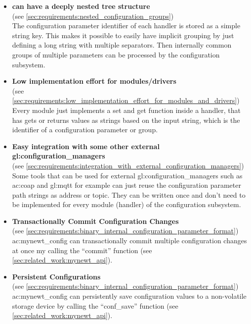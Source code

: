 \begin{itemize}
      \item \textbf{ can have a deeply nested tree structure}\\
            (see \autoref{sec:requirements:nested_configuration_groups})\\
            The configuration parameter identifier of each handler is stored as a simple string key.
            This makes it possible to easily have implicit grouping by just defining a long string with multiple separators.
            Then internally common groups of multiple parameters can be processed by the configuration subsystem.

      \item \textbf{Low implementation effort for modules/drivers}\\
            (see \autoref{sec:requirements:low_implementation_effort_for_modules_and_drivers})\\
            Every module just implements a set and get function inside a handler, that has gets or returns values as strings based on the input string, which is the identifier of a configuration parameter or group.

      \item \textbf{Easy integration with some other external \glspl{gl:configuration_manager}}\\
            (see \autoref{sec:requirements:integration_with_external_configuration_managers})\\
            Some tools that can be used for external \glspl{gl:configuration_manager} such as \gls{ac:coap} and \gls{gl:mqtt} for example can just reuse the configuration parameter path strings as address or topic.
            They can be written once and don't need to be implemented for every module (handler) of the configuration subsystem.

      \item \textbf{Transactionally Commit Configuration Changes}\\
            (see \autoref{sec:requirements:binary_internal_configuration_parameter_format})\\
            \gls{ac:mynewt_config} can transactionally commit multiple configuration changes at once my calling the ``commit'' function (see \autoref{sec:related_work:mynewt_api}).

      \item \textbf{Persistent Configurations}\\
            (see \autoref{sec:requirements:binary_internal_configuration_parameter_format})\\
            \gls{ac:mynewt_config} can persistently save configuration values to a non-volatile storage device by calling the ``conf\_save'' function (see \autoref{sec:related_work:mynewt_api}).
\end{itemize}

